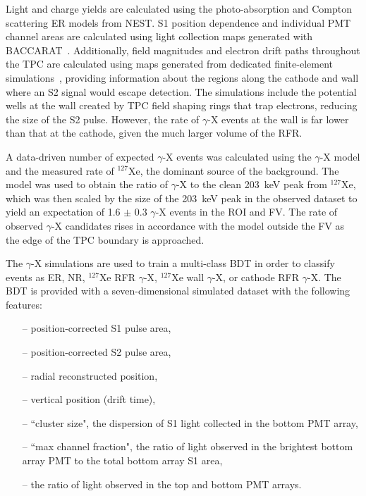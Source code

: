 \documentclass[reprint, showpacs,
preprintnumbers,
amsmath,amssymb,
aps, floatfix,
superscriptaddress,
prd, nofootinbib]{revtex4-1}
\begin{document}
Light and charge yields are calculated using the photo-absorption and Compton scattering ER models from NEST.
S1 position dependence and individual PMT channel areas are calculated using light collection maps generated with BACCARAT~\cite{LZ:simulations_2021}. 
Additionally, field magnitudes and electron drift paths throughout the TPC are calculated using maps generated from dedicated finite-element simulations~\cite{fenics}, providing information about the regions along the cathode and wall where an S2 signal would escape detection.
The simulations include the potential wells at the wall created by TPC field shaping rings that trap electrons, reducing the size of the S2 pulse.
However, the rate of $\gamma$-X events at the wall is far lower than that at the cathode, given the much larger volume of the RFR. 
\par
A data-driven number of expected $\gamma$-X events was calculated using the $\gamma$-X model and the measured rate of $^{127}$Xe, the dominant source of the background.
The model was used to obtain the ratio of $\gamma$-X to the clean 203~keV peak from $^{127}$Xe, which was then scaled by the size of the 203~keV peak in the observed dataset to yield an expectation of 1.6 $\pm$ 0.3 $\gamma$-X events in the ROI and FV. 
The rate of observed $\gamma$-X candidates rises in accordance with the model outside the FV as the edge of the TPC boundary is approached. 
\par
The $\gamma$-X simulations are used to train a multi-class BDT in order to classify events as ER, NR, $^{127}$Xe RFR $\gamma$-X, $^{127}$Xe wall $\gamma$-X, or cathode RFR $\gamma$-X.
The BDT is provided with a seven-dimensional simulated dataset with the following features: 
\begin{itemize}
\vspace{-0.25cm}
    \item[--] position-corrected S1 pulse area,
    \vspace{-0.25cm}
\item[--] position-corrected S2 pulse area,
   \vspace{-0.25cm}
 \item[--] radial reconstructed position,
    \vspace{-0.25cm}
\item[--] vertical position (drift time),
    \vspace{-0.25cm}
\item[--] ``cluster size",  the dispersion of S1 light collected in the bottom PMT array,
    \vspace{-0.25cm}
\item[--] ``max channel fraction", the ratio of light observed in the brightest bottom array PMT to the total bottom array S1 area,
    \vspace{-0.25cm}
\item[--] the ratio of light observed in the top and bottom PMT arrays.
\end{itemize}
\end{document}
